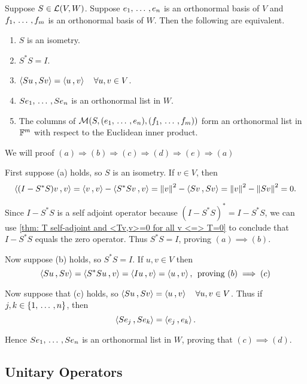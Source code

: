 \begin{thm}
  \label{thm: characterizations of isometeries}
  Suppose $S \in \mathcal{L} (V,W)$. Suppose $e_1, {\, \ldots \,\,}, e_n$ is an orthonormal basis of $V$ and $f_1, {\, \ldots \,\,}, f_m$ is an orthonormal basis of $W$. Then the following are equivalent.
  \begin{enumerate}[label=\textbf{(\alph*)}]
    \item $S$ is an isometry.
    \item $S^*S = I$.
    \item $\ip{Su}{Sv} = \ip{u}{v} \quad \forall u,v \in V$.
    \item $Se_1, {\, \ldots \,\,}, Se_n$ is an orthonormal list in $W$.
    \item The columns of $\mathcal{M}(S, (e_1, {\, \ldots \,\,}, e_n), (f_1, {\, \ldots \,\,}, f_m))$ form an orthonormal list in $\mathbb{F}^m$ with respect to the Euclidean inner product.
  \end{enumerate}
\end{thm}
\begin{prf}
  We will proof $(a) \Rightarrow (b) \Rightarrow (c) \Rightarrow (d) \Rightarrow (e)  \Rightarrow (a)$

   First suppose (a) holds, so $S$ is an isometry. If $v\in V$, then
  \[
  \ip{(I-S^*S)v}{v} = \ip{v}{v} - \ip{S^*Sv}{v} = \norm{v}^2-\ip{Sv}{Sv} = \norm{v}^2 - \norm{Sv}^2 = 0.
  \]

  Since $I-S^*S$ is a self adjoint operator because $(I-S^*S)^* = I-S^*S$, we can use \ref{thm: T self-adjoint and <Tv,v>=0 for all v <=> T=0} to conclude that $I-S^*S$ equals the zero operator. Thus $S^*S = I$, proving $(a) \implies (b)$.

   Now suppose (b) holds, so $S^*S=I$. If $u,v \in V$ then
  \[
  \ip{Su}{Sv} = \ip{S^*Su}{v} = \ip{Iu}{v} = \ip{u}{v}, \; $ proving $ (b) \implies (c)
  \]

   Now suppose that (c) holds, so $\ip{Su}{Sv} = \ip{u}{v} \quad \forall u,v \in V$. Thus if $j,k \in \{1, {\, \ldots \,\,}, n\}$, then
  \[
  \ip{Se_j}{Se_k} = \ip{e_j}{e_k}.
  \]

  Hence $Se_1, {\, \ldots \,\,}, Se_n$ is an orthonormal list in $W$, proving that $(c) \implies (d)$.
\end{prf}

\subsection{Unitary Operators}


